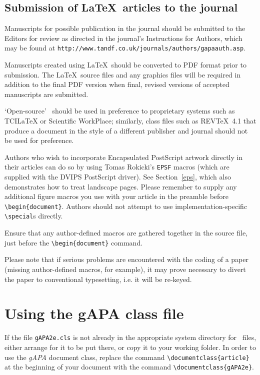 \documentclass{gAPA2e}
\theoremstyle{plain}
\theoremstyle{remark}
\theoremstyle{definition}
\begin{document}
\subsection{Submission of \LaTeX\ articles to the journal}\label{S1.2}

Manuscripts for possible publication in the journal should be submitted to the Editors for review as directed in the journal's Instructions for Authors, which may be found at {\tt{http://www.tandf.co.uk/journals/authors/gapaauth.asp}}.

Manuscripts created using \LaTeX\ should be converted to PDF format prior to submission. The \LaTeX\ source files and any graphics files will be required in addition to the final PDF version when final, revised versions of accepted manuscripts are submitted.

`Open-source' \LaTeXe\ should be used in preference to proprietary systems such as TCILaTeX or Scientific WorkPlace; similarly, class files such as REVTeX~4.1 that produce a document in the style of a different publisher and journal should not be used for preference.

Authors who wish to incorporate Encapsulated PostScript artwork directly in their articles can do so by using
Tomas Rokicki's {\tt EPSF} macros (which are supplied with the DVIPS PostScript driver). See Section~\ref{eps},
which also demonstrates how to treat landscape pages. Please remember to supply any additional figure macros you
use with your article in the preamble before \verb"\begin{document}". Authors should not attempt to use
implementation-specific \verb"\special"s directly.

Ensure that any author-defined macros are gathered together in the source file, just before the
\verb"\begin{document}" command.

Please note that if serious problems are encountered with the coding of a paper (missing author-defined macros,
for example), it may prove necessary to divert the paper to conventional typesetting, i.e. it will be re-keyed.


\section{Using the {\bi gAPA} class file}

If the file {\tt gAPA2e.cls} is not already in the appropriate system directory for \LaTeXe\ files, either
arrange for it to be put there, or copy it to your working folder. In order to use the {\it gAPA} document class, replace
the command \verb"\documentclass{article}" at the beginning of your document with the command \verb"\documentclass{gAPA2e}".
\end{document}

